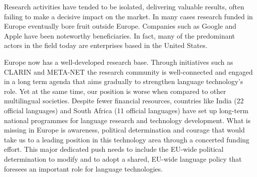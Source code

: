 \documentclass[10pt, plain]{../../metanetpaper}
\begin{document}
\begin{multicols}{2}
Research activities have tended to be isolated, delivering valuable results, often failing to make a decisive impact on the market. In many cases research funded in Europe eventually bore fruit outside Europe. Companies such as Google and Apple have been noteworthy beneficiaries. In fact, many of the predominant actors in the field today are enterprises based in the United States.

%
%
%
%

Europe now has a well-developed research base. Through initiatives such as CLARIN and META-NET the research community is well-connected and engaged in a long term agenda that aims gradually to strengthen language technology's role. Yet at the same time, our position is worse when compared to other multilingual societies. Despite fewer financial resources, countries like India (22 official languages) and South Africa (11 official languages) have set up long-term national programmes for language research and technology development. What is missing in Europe is awareness, political determination and courage that would take us to a leading position in this technology area through a concerted funding effort. This major dedicated push needs to include the EU-wide political determination to modify and to adopt a shared, EU-wide language policy that foresees an important role for language technologies. 


\end{multicols}
\end{document}
